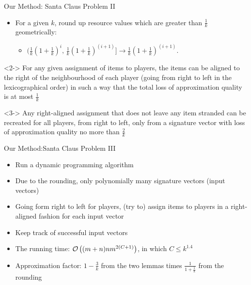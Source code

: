 \documentclass[10pt]{beamer}
\begin{document}
\begin{frame}{Our Method: Santa Claus Problem II}
	\begin{itemize}
    	\item<1-> For a given $k$, round \alert{up} resource values which are greater than $\frac{1}{k}$ geometrically:
    	\begin{itemize}
    	    \item<2-> $\Big( \frac{1}{k}(1 + \frac{1}{k})^i, \, \frac{1}{k}(1 + \frac{1}{k})^{(i + 1)} \Big]  \rightarrow \frac{1}{k}(1 + \frac{1}{k})^{(i + 1)}$.
    	\end{itemize}
	\end{itemize}
	\begin{lemma}<2->
    	For any given assignment of items to players, the items can be \alert{aligned} to the right of the neighbourhood of each player (going from right to left in the lexicographical order) in such a way that the total loss of approximation quality is at most $\frac{1}{k}$
    \end{lemma}
    \begin{lemma}<3->
    	Any right-aligned assignment that does not leave any item \alert{stranded} can be recreated for all players, from right to left, only from a \alert{signature vector} with loss of approximation quality no more than $\frac{2}{k}$
    \end{lemma}
\end{frame}

\begin{frame}{Our Method:Santa Claus Problem III}
	\begin{itemize}
    	\item<1-> Run a dynamic programming algorithm
        \item<2-> Due to the rounding, only polynomially many signature vectors (\alert{input vectors)}
        \item<3-> Going form right to left for players, (try to) assign items to players in a right-aligned fashion for each input vector
        \item<4-> Keep track of \alert{successful} input vectors
        \item<5-> The running time: $\mathcal{O} \left( (m + n)nm^{2(C+1)} \right)$, in which $C \leq k^{1.4}$
        \item<6-> Approximation factor: $1 - \frac{3}{k}$ from the \alert{two lemmas} times $\frac{1}{1 + \frac{1}{k}}$ from the \alert{rounding}
	\end{itemize}
\end{frame}
\end{document}
